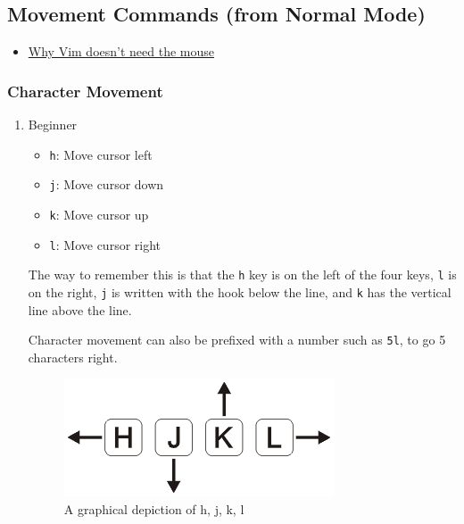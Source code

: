 \documentclass[11pt]{article}
\begin{document}
\subsection{Movement Commands (from Normal Mode)}
\label{sec:orgfa22d8d}

\begin{itemize}
\item \href{https://www.youtube.com/watch?v=tQCRVkSFFEc}{Why Vim doesn't need the mouse}
\end{itemize}
\subsubsection{Character Movement}
\label{sec:orgbe3b410}
\begin{enumerate}
\item Beginner
\label{sec:org876e037}
\begin{itemize}
\item \texttt{h}: Move cursor left
\item \texttt{j}: Move cursor down
\item \texttt{k}: Move cursor up
\item \texttt{l}: Move cursor right
\end{itemize}

The way to remember this is that the \texttt{h} key is on the left of the four keys,
\texttt{l} is on the right, \texttt{j} is written with the hook below the line, and \texttt{k} has
the vertical line above the line.

Character movement can also be prefixed with a number such as \texttt{5l}, to go 5
characters right.

\begin{figure}[htbp]
\centering
\includegraphics[width=.9\linewidth]{./hjkl.png}
\caption{\label{fig:orgde825b9}
A graphical depiction of h, j, k, l}
\end{figure}
\end{enumerate}
\end{document}
